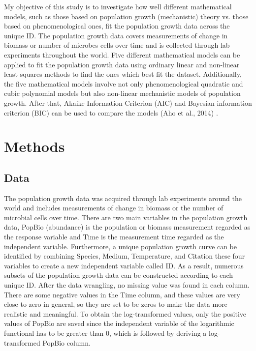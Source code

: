 \documentclass[11pt, a4paper]{article}
\begin{document}
My objective of this study is to investigate how well different mathematical models, such as those based on population growth (mechanistic) theory vs. those based on phenomenological ones, fit the population growth data across the unique ID. The population growth data covers measurements of change in biomass or number of microbes cells over time and is collected through lab experiments throughout the world. Five different mathematical models can be applied to fit the population growth data using ordinary linear and non-linear least squares methods to find the ones which best fit the dataset. Additionally, the five mathematical models involve not only phenomenological quadratic and cubic polynomial models but also non-linear mechanistic models of population growth. After that, Akaike Information Criterion (AIC) and Bayesian information criterion (BIC) can be used to compare the models (Aho et al., 2014) \cite{aho2014model}.


\section{Methods}
\subsection{Data}
The population growth data was acquired through lab experiments around the world and includes measurements of change in biomass or the number of microbial cells over time. There are two main variables in the population growth data, PopBio (abundance) is the population or biomass measurement regarded as the response variable and Time is the measurement time regarded as the independent variable. Furthermore, a unique population growth curve can be identified by combining Species, Medium, Temperature, and Citation these four variables to create a new independent variable called ID. As a result, numerous subsets of the population growth data can be constructed according to each unique ID. After the data wrangling, no missing value was found in each column. There are some negative values in the Time column, and these values are very close to zero in general, so they are set to be zeros to make the data more realistic and meaningful. To obtain the log-transformed values, only the positive values of PopBio are saved since the independent variable of the logarithmic functional has to be greater than 0, which is followed by deriving a log-transformed PopBio column.
\end{document}
